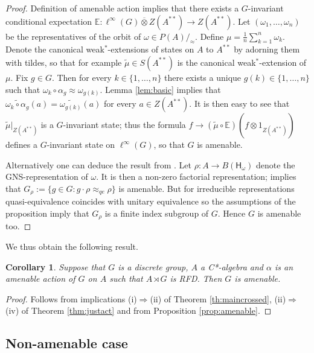 \documentclass[11 pt, leqno, hidelinks]{amsart}%
\theoremstyle{plain}
\newtheorem{corollary}[theorem]{Corollary}
\numberwithin{equation}{section}
\newcommand{\Hil}{\mathsf{H}}
\begin{document}
\begin{proof}
Definition of amenable action \cite[D\'efinition and Theorem 3.3]{Claire} implies that there exists a $G$-invariant conditional expectation $\mathbb{E}: \ell^{\infty}(G) \overline{\otimes} Z(A^{**}) \to Z(A^{**})$.
Let $(\omega_1, \ldots, \omega_n)$ be the representatives of the orbit of $\omega \in P(A)/_{\approx}$. Define $\mu=\frac{1}{n}\sum_{k=1}^n \omega_k$. Denote the canonical weak$^*$-extensions of states on $A$ to $A^{**}$ by adorning them with tildes, so that for example $\tilde{\mu} \in S(A^{**})$ is the canonical weak$^*$-extension of $\mu$. Fix $g \in G$. Then for every $k\in\{1,\ldots,n\}$ there exists a unique $g(k)\in \{1, \ldots,n\}$ such that $\omega_k \circ \alpha_g \approx \omega_{g(k)}$.  Lemma \ref{lem:basic} implies that $\widetilde{\omega_k \circ \alpha_g} (a) = \widetilde{\omega_{g(k)}}(a)$ for every $a \in Z(A^{**})$. It is then easy to see that $\tilde{\mu}|_{Z(A^{**})}$ is a $G$-invariant state; thus the formula $f \to (\tilde{\mu} \circ \mathbb{E})(f \otimes 1_{Z(A^{**})})$ defines a $G$-invariant state on  $\ell^{\infty}(G)$, so that $G$ is amenable.


Alternatively one can deduce the result from \cite[Corollaire 4.4]{Claire}. Let $\rho:A \to B(\Hil_\omega)$ denote the GNS-representation of $\omega$. It is then a non-zero factorial representation; \cite[Corollaire 4.4]{Claire} implies that $G_\rho:=\{g \in G: g \cdot \rho \approx_{qe} \rho\}$ is amenable. But for irreducible representations quasi-equivalence coincides with unitary equivalence so the assumptions of the proposition imply that $G_\rho$ is a finite index subgroup of $G$. Hence $G$ is amenable too.
\end{proof}	

We thus obtain the following result.

\begin{corollary}\label{cor:amen}
Suppose that  $G$ is a discrete  group, $A$ a C*-algebra 	and $\alpha$ is an amenable action of $G$ on $A$ such that $A \rtimes G$ is RFD. Then $G$ is amenable.
\end{corollary}
\begin{proof}
Follows from implications (i)$\Longrightarrow$(ii) of Theorem \ref{th:maincrossed}, (ii)$\Longrightarrow$(iv) of Theorem \ref{thm:justact} and from Proposition \ref{prop:amenable}.
\end{proof}

\medskip


 \subsection{Non-amenable case}
\end{document}
